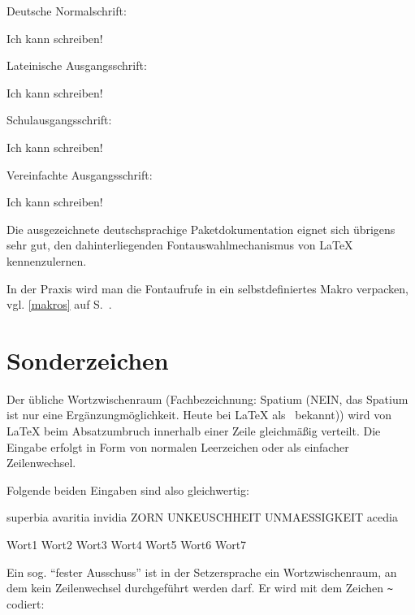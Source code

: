 Deutsche Normalschrift:

\begin{LTXexample}
{
\huge
Ich kann schreiben!}
\end{LTXexample}

Lateinische Ausgangsschrift:

\begin{LTXexample}
{
\huge
Ich kann schreiben!}
\end{LTXexample}

Schulausgangsschrift:

\begin{LTXexample}
{
\huge
Ich kann schreiben!}
\end{LTXexample}

Vereinfachte Ausgangsschrift:

\begin{LTXexample}
{
\huge
Ich kann schreiben!}
\end{LTXexample}

Die ausgezeichnete deutschsprachige Paketdokumentation eignet sich übrigens sehr gut,
den dahinterliegenden Fontauswahlmechanismus von \LaTeX{} kennenzulernen.

In der Praxis wird man die Fontaufrufe in ein selbstdefiniertes Makro verpacken, 
vgl. \ref{makros} auf S.~\pageref{makros}.


\section{Sonderzeichen}

\cite{voss:dtk20011/1}


Der übliche Wortzwischenraum (Fachbezeichnung: Spatium (NEIN, das Spatium ist nur eine Ergänzungmöglichkeit. Heute bei LaTeX als \, bekannt)) wird von \LaTeX{} beim Absatzumbruch innerhalb einer Zeile
gleichmäßig verteilt. Die Eingabe erfolgt in Form von normalen Leerzeichen oder als 
einfacher Zeilenwechsel.

Folgende beiden Eingaben sind also gleichwertig:

\begin{LTXexample}
 superbia avaritia invidia ZORN UNKEUSCHHEIT UNMAESSIGKEIT acedia
 
 Wort1
 Wort2
 Wort3
 Wort4
 Wort5
 Wort6
 Wort7
\end{LTXexample}

Ein sog. \enquote{fester Ausschuss} ist in der Setzersprache ein Wortzwischenraum, an dem 
kein Zeilenwechsel durchgeführt werden darf. Er wird mit dem Zeichen \lstinline/~/
codiert:

